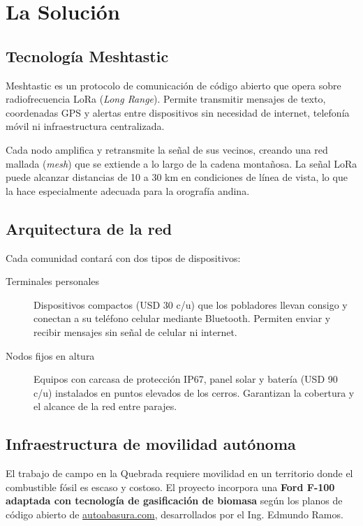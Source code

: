 \documentclass[12pt,a4paper]{article}
\begin{document}
\section{La Solución}

\subsection{Tecnología Meshtastic}

Meshtastic es un protocolo de comunicación de código abierto que opera sobre radiofrecuencia LoRa (\textit{Long Range}). Permite transmitir mensajes de texto, coordenadas GPS y alertas entre dispositivos sin necesidad de internet, telefonía móvil ni infraestructura centralizada.

Cada nodo amplifica y retransmite la señal de sus vecinos, creando una red mallada (\textit{mesh}) que se extiende a lo largo de la cadena montañosa. La señal LoRa puede alcanzar distancias de 10 a 30 km en condiciones de línea de vista, lo que la hace especialmente adecuada para la orografía andina.

\subsection{Arquitectura de la red}

Cada comunidad contará con dos tipos de dispositivos:

\begin{description}
  \item[Terminales personales] Dispositivos compactos (USD 30 c/u) que los pobladores llevan consigo y conectan a su teléfono celular mediante Bluetooth. Permiten enviar y recibir mensajes sin señal de celular ni internet.

  \item[Nodos fijos en altura] Equipos con carcasa de protección IP67, panel solar y batería (USD 90 c/u) instalados en puntos elevados de los cerros. Garantizan la cobertura y el alcance de la red entre parajes.
\end{description}

\subsection{Infraestructura de movilidad autónoma}

El trabajo de campo en la Quebrada requiere movilidad en un territorio donde el combustible fósil es escaso y costoso. El proyecto incorpora una \textbf{Ford F-100 adaptada con tecnología de gasificación de biomasa} según los planos de código abierto de \href{https://autoabasura.com}{autoabasura.com}, desarrollados por el Ing. Edmundo Ramos.
\end{document}
